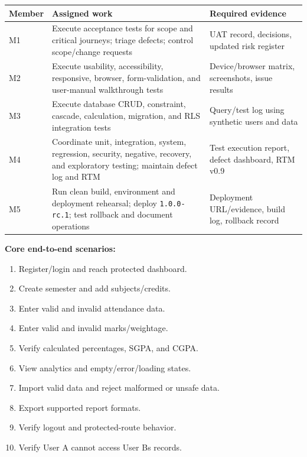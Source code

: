 \documentclass[
  10pt,
  a4paper,
  oneside]{report}
\newcounter{none} %
\providecommand{\tightlist}{%
  \setlength{\itemsep}{0pt}\setlength{\parskip}{0pt}}
\begin{document}
{\def\LTcaptype{none} %
\begin{longtable}[]{@{}
  >{\raggedright\arraybackslash}p{}
  >{\raggedright\arraybackslash}p{}
  >{\raggedright\arraybackslash}p{}@{}}
\toprule\noalign{}
\begin{minipage}[b]{\linewidth}\raggedright
Member
\end{minipage} & \begin{minipage}[b]{\linewidth}\raggedright
Assigned work
\end{minipage} & \begin{minipage}[b]{\linewidth}\raggedright
Required evidence
\end{minipage} \\
\midrule\noalign{}
\endhead
\bottomrule\noalign{}
\endlastfoot
M1 & Execute acceptance tests for scope and critical journeys; triage
defects; control scope/change requests & UAT record, decisions, updated
risk register \\
M2 & Execute usability, accessibility, responsive, browser,
form-validation, and user-manual walkthrough tests & Device/browser
matrix, screenshots, issue results \\
M3 & Execute database CRUD, constraint, cascade, calculation, migration,
and RLS integration tests & Query/test log using synthetic users and
data \\
M4 & Coordinate unit, integration, system, regression, security,
negative, recovery, and exploratory testing; maintain defect log and RTM
& Test execution report, defect dashboard, RTM v0.9 \\
M5 & Run clean build, environment and deployment rehearsal; deploy
\texttt{1.0.0-rc.1}; test rollback and document operations & Deployment
URL/evidence, build log, rollback record \\
\end{longtable}
}

\textbf{Core end-to-end scenarios:}

\begin{enumerate}
\def\labelenumi{\arabic{enumi}.}
\tightlist
\item
  Register/login and reach protected dashboard.
\item
  Create semester and add subjects/credits.
\item
  Enter valid and invalid attendance data.
\item
  Enter valid and invalid marks/weightage.
\item
  Verify calculated percentages, SGPA, and CGPA.
\item
  View analytics and empty/error/loading states.
\item
  Import valid data and reject malformed or unsafe data.
\item
  Export supported report formats.
\item
  Verify logout and protected-route behavior.
\item
  Verify User A cannot access User B\textquotesingle s records.
\end{enumerate}
\end{document}
